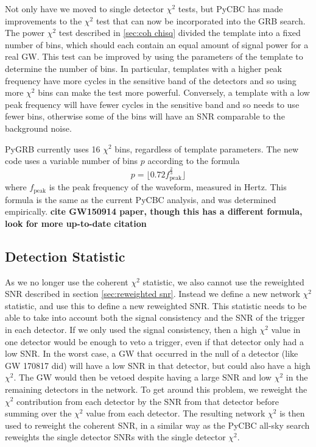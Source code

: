 \documentclass[11pt]{cuthesis}
\begin{document}
Not only have we moved to single detector $\chi^2$ tests, but PyCBC has made improvements to the $\chi^2$ test that can now be incorporated into the GRB search. The power $\chi^2$ test described in \ref{sec:coh chisq} divided the template into a fixed number of bins, which should each contain an equal amount of signal power for a real GW. This test can be improved by using the parameters of the template to determine the number of bins. In particular, templates with a higher peak frequency have more cycles in the sensitive band of the detectors and so using more $\chi^2$ bins can make the test more powerful. Conversely, a template with a low peak frequency will have fewer cycles in the sensitive band and so needs to use fewer bins, otherwise some of the bins will have an SNR comparable to the background noise. 

PyGRB currently uses 16 $\chi^2$ bins, regardless of template parameters. The new code uses a variable number of bins $p$ according to the formula
\begin{equation}
p = \lfloor 0.72 f_\text{peak}^\frac{2}{3} \rfloor
\end{equation}
where $f_\text{peak}$ is the peak frequency of the waveform, measured in Hertz. This formula is the same as the current PyCBC analysis, and was determined empirically. \textbf{cite GW150914 paper, though this has a different formula, look for more up-to-date citation}

\subsection{Detection Statistic} \label{sec:new det stat}
As we no longer use the coherent $\chi^2$ statistic, we also cannot use the reweighted SNR described in section \ref{sec:reweighted snr}. Instead we define a new network $\chi^2$ statistic, and use this to define a new reweighted SNR. This statistic needs to be able to take into account both the signal consistency and the SNR of the trigger in each detector. If we only used the signal consistency, then a high $\chi^2$ value in one detector would be enough to veto a trigger, even if that detector only had a low SNR. In the worst case, a GW that occurred in the null of a detector (like GW 170817 did) will have a low SNR in that detector, but could also have a high $\chi^2$. The GW would then be vetoed despite having a large SNR and low $\chi^2$ in the remaining detectors in the network. To get around this problem, we reweight the $\chi^2$ contribution from each detector by the SNR from that detector before summing over the $\chi^2$ value from each detector. The resulting network $\chi^2$ is then used to reweight the coherent SNR, in a similar way as the PyCBC all-sky search reweights the single detector SNRs with the single detector $\chi^2$. 
\end{document}
